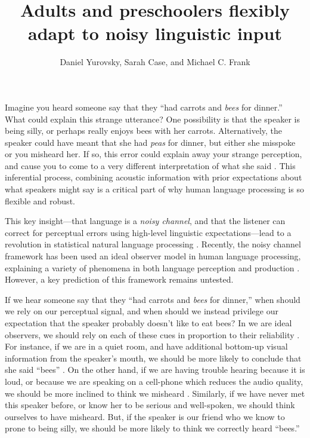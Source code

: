 \documentclass[man,floatsintext]{apa6}
\title{Adults and preschoolers flexibly adapt to noisy linguistic input}
\author{Daniel Yurovsky, Sarah Case, and Michael C. Frank}
\affiliation{Stanford University}
\begin{document}
\maketitle

Imagine you heard someone say that they ``had carrots and \emph{bees} for dinner.'' What could explain this strange utterance? One possibility is that the speaker is being silly, or perhaps really enjoys bees with her carrots. Alternatively, the speaker could have meant that she had \emph{peas} for dinner, but either she misspoke or you misheard her. If so, this error could explain away your strange perception, and cause you to come to a very different interpretation of what she said \cite{pearl1988}. This inferential process, combining acoustic information with prior expectations about what speakers might say is a critical part of why human language processing is so flexible and robust.

This key insight---that language is a \emph{noisy channel}, and that the listener can correct for perceptual errors using high-level linguistic expectations---lead to a revolution in statistical natural language processing \cite{jelinek1976, shannon1948}. Recently, the noisy channel framework has been used an ideal observer model in human language processing, explaining a variety of phenomena in both language perception and production \cite{cayards2008, levy2008, jaeger2010, kleinschmidt2015}. However, a key prediction of this framework remains untested.

If we hear someone say that they ``had carrots and \emph{bees} for dinner,'' when should we rely on our perceptual signal, and when should we instead privilege our expectation that the speaker probably doesn't like to eat bees? In we are ideal observers, we should rely on each of these cues in proportion to their reliability \cite{ernst2002, jacobs1999}. For instance, if we are in a quiet room, and have additional bottom-up visual information from the speaker's mouth, we should be more likely to conclude that she said ``bees'' \cite{mcgurk1976}. On the other hand, if we are having trouble hearing because it is loud, or because we are speaking on a cell-phone which reduces the audio quality, we should be more inclined to think we misheard \cite{schroeder1985}. Similarly, if we have never met this speaker before, or know her to be serious and well-spoken, we should think ourselves to have misheard. But, if the speaker is our friend who we know to prone to being silly, we should be more likely to think we correctly heard ``bees.''
\end{document}
